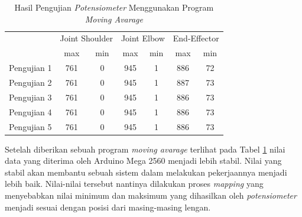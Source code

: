 \begin{table}[H]
	\centering
	\caption{Hasil Pengujian \textit{Potensiometer} Menggunakan Program \textit{Moving Avarage}}
	\label{tbl.potensiometer2}
	\begin{tabular}{|c|c|c|c|c|c|c|}
		\hline
		\rowcolor[HTML]{9B9B9B} 
		\cellcolor[HTML]{9B9B9B}                            & \multicolumn{2}{c|}{\cellcolor[HTML]{9B9B9B}Joint Shoulder} & \multicolumn{2}{c|}{\cellcolor[HTML]{9B9B9B}Joint Elbow} & \multicolumn{2}{c|}{\cellcolor[HTML]{9B9B9B}End-Effector} \\ \cline{2-7} 
		\rowcolor[HTML]{9B9B9B} 
		\multirow{-2}{*}{\cellcolor[HTML]{9B9B9B}Pengujian} & max                          & min                          & max                         & min                        & max                         & min                         \\ \hline
		Pengujian 1                                         & 761                          & 0                            & 945                         & 1                          & 886                         & 72                          \\ \hline
		Pengujian 2                                         & 761                          & 0                            & 945                         & 1                          & 887                         & 73                          \\ \hline
		Pengujian 3                                         & 761                          & 0                            & 945                         & 1                          & 886                         & 73                          \\ \hline
		Pengujian 4                                         & 761                          & 0                            & 945                         & 1                          & 886                         & 73                          \\ \hline
		Pengujian 5                                         & 761                          & 0                            & 945                         & 1                          & 886                         & 73                          \\ \hline
	\end{tabular}
	
\end{table} 

Setelah diberikan sebuah program \textit{moving avarage} terlihat pada Tabel \ref{tbl.potensiometer2} nilai data yang diterima oleh Arduino Mega 2560 menjadi lebih stabil. Nilai yang stabil akan membantu sebuah sistem dalam melakukan pekerjaannya menjadi lebih baik. Nilai-nilai tersebut nantinya dilakukan proses \textit{mapping} yang menyebabkan nilai minimum dan maksimum yang dihasilkan oleh \textit{potensiometer} menjadi sesuai dengan posisi dari masing-masing lengan.


